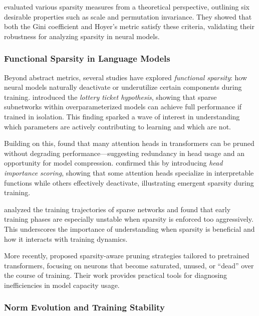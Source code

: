 \citet{hurley2009gini} evaluated various sparsity measures from a theoretical perspective, outlining six desirable properties such as scale and permutation invariance. They showed that both the Gini coefficient and Hoyer’s metric satisfy these criteria, validating their robustness for analyzing sparsity in neural models.

\subsubsection{Functional Sparsity in Language Models}

Beyond abstract metrics, several studies have explored \textit{functional sparsity}: how neural models naturally deactivate or underutilize certain components during training. \citet{frankle2019lottery} introduced the \textit{lottery ticket hypothesis}, showing that sparse subnetworks within overparameterized models can achieve full performance if trained in isolation. This finding sparked a wave of interest in understanding which parameters are actively contributing to learning and which are not.

Building on this, \citet{michel2019sixteen} found that many attention heads in transformers can be pruned without degrading performance—suggesting redundancy in head usage and an opportunity for model compression. \citet{voita2019analyzing} confirmed this by introducing \textit{head importance scoring}, showing that some attention heads specialize in interpretable functions while others effectively deactivate, illustrating emergent sparsity during training.

\citet{evci2020rigging} analyzed the training trajectories of sparse networks and found that early training phases are especially unstable when sparsity is enforced too aggressively. This underscores the importance of understanding when sparsity is beneficial and how it interacts with training dynamics.

More recently, \citet{jiang2023pruning} proposed sparsity-aware pruning strategies tailored to pretrained transformers, focusing on neurons that become saturated, unused, or ``dead'' over the course of training. Their work provides practical tools for diagnosing inefficiencies in model capacity usage.

\subsubsection{Norm Evolution and Training Stability}

